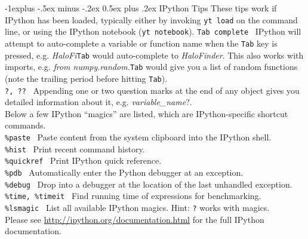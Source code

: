 \documentclass[10pt,landscape]{article}
\makeatletter
\renewcommand{\subsection}{\@startsection{subsection}{2}{0mm}%
                                {-1explus -.5ex minus -.2ex}%
                                {0.5ex plus .2ex}%
                                {\normalfont\normalsize\bfseries}}
\makeatother
\begin{document}
\begin{multicols}{3}
\subsection{IPython Tips}
These tips work if IPython has been loaded, typically either by invoking
\texttt{yt load} on the command line, or using the IPython notebook (\texttt{yt notebook}).
\texttt{Tab complete} \textemdash\ IPython will attempt to auto-complete a
variable or function name when the \texttt{Tab} key is pressed, e.g. \textit{HaloFi}\textendash\texttt{Tab} would auto-complete
to \textit{HaloFinder}. This also works with imports, e.g. \textit{from numpy.random.}\textendash\texttt{Tab}
would give you a list of random functions (note the trailing period before hitting \texttt{Tab}).\\
\texttt{?, ??} \textemdash\ Appending one or two question marks at the end of any object gives you
detailed information about it, e.g. \textit{variable\_name}?.\\
Below a few IPython ``magics'' are listed, which are IPython-specific shortcut commands.\\
\texttt{\%paste} \textemdash\ Paste content from the system clipboard into the IPython shell.\\
\texttt{\%hist} \textemdash\ Print recent command history.\\
\texttt{\%quickref} \textemdash\ Print IPython quick reference.\\
\texttt{\%pdb} \textemdash\ Automatically enter the Python debugger at an exception.\\
\texttt{\%debug} \textemdash\ Drop into a debugger at the location of the last unhandled exception. \\
\texttt{\%time, \%timeit} \textemdash\ Find running time of expressions for benchmarking.\\
\texttt{\%lsmagic} \textemdash\ List all available IPython magics. Hint: \texttt{?} works with magics.\\


Please see \url{http://ipython.org/documentation.html} for the full
IPython documentation.


\end{multicols}
\end{document}
